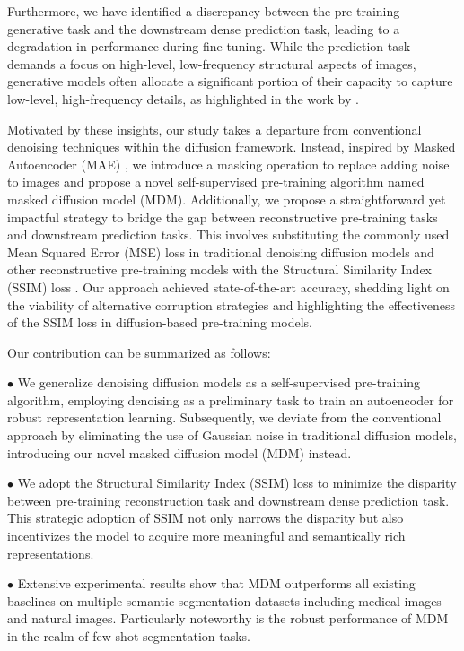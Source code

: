 \documentclass{article} \usepackage{iclr2024_conference,times}
\begin{document}
Furthermore, we have identified a discrepancy between the pre-training generative task and the downstream dense prediction task, leading to a degradation in performance during fine-tuning. While the prediction task demands a focus on high-level, low-frequency structural aspects of images, generative models often allocate a significant portion of their capacity to capture low-level, high-frequency details, as highlighted in the work by \citet{DBLP:conf/icml/RameshPGGVRCS21}. 

Motivated by these insights, our study takes a departure from conventional denoising techniques within the diffusion framework. Instead, inspired by Masked Autoencoder (MAE) \citep{DBLP:conf/cvpr/HeCXLDG22}, we introduce a masking operation to replace adding noise to images and propose a novel self-supervised pre-training algorithm named masked diffusion model (MDM). Additionally, we propose a straightforward yet impactful strategy to bridge the gap between reconstructive pre-training tasks and downstream prediction tasks. This involves substituting the commonly used Mean Squared Error (MSE) loss in traditional denoising diffusion models and other reconstructive pre-training models with the Structural Similarity Index (SSIM) loss \citep{DBLP:journals/tip/WangBSS04}. Our approach achieved state-of-the-art accuracy, shedding light on the viability of alternative corruption strategies and highlighting the effectiveness of the SSIM loss in diffusion-based pre-training models.

Our contribution can be summarized as follows:

$\bullet$ We generalize denoising diffusion models as a self-supervised pre-training algorithm, employing denoising as a preliminary task to train an autoencoder for robust representation learning. Subsequently, we deviate from the conventional approach by eliminating the use of Gaussian noise in traditional diffusion models, introducing our novel masked diffusion model (MDM) instead.

$\bullet$ We adopt the Structural
Similarity Index (SSIM) loss to minimize the disparity between pre-training reconstruction task and downstream dense prediction task. This strategic adoption of SSIM not only narrows the disparity but also incentivizes the model to acquire more meaningful and semantically rich representations.

$\bullet$ Extensive experimental results show that MDM outperforms all existing baselines on multiple semantic segmentation datasets including medical images and natural images. Particularly noteworthy is the robust performance of MDM in the realm of few-shot segmentation tasks.
\end{document}
